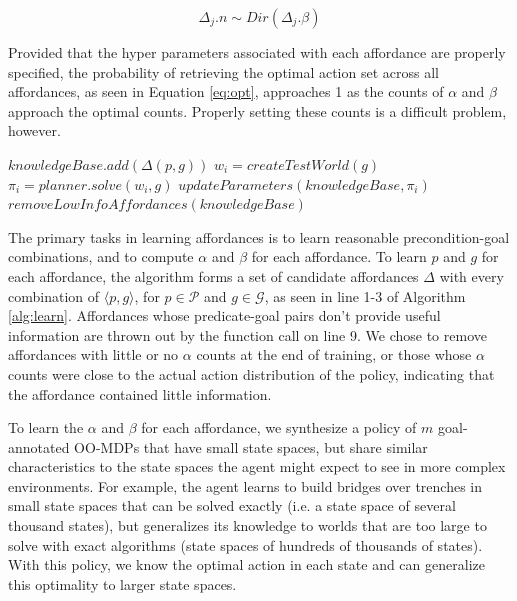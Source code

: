 \documentclass[conference]{IEEEtran}
\begin{document}
\begin{equation}
\Delta_j.n \sim Dir(\Delta_j.\beta)
\end{equation}

Provided that the hyper parameters associated with each
affordance are properly specified, the probability of retrieving the optimal
action set across all affordances, as seen in Equation \ref{eq:opt}, approaches
1 as the counts of $\alpha$ and $\beta$ approach the optimal counts. Properly setting these counts
is a difficult problem, however.

\begin{algorithm}
  \caption{$learn(\mathcal{P}, \mathcal{G})$}
  \begin{algorithmic}[1]
    \State $knowledgeBase.add(\Delta(p,g))$
    \EndFor
    \State $w_i = createTestWorld(g)$
    \State $\pi_i = planner.solve(w_i, g)$
    \State $updateParameters(knowledgeBase, \pi_i)$
    \EndFor
    \State $removeLowInfoAffordances(knowledgeBase)$
  \end{algorithmic}
  \label{alg:learn}
\end{algorithm}
The primary tasks in learning affordances is to learn reasonable precondition-goal combinations,
and to compute $\alpha$ and $\beta$ for each affordance. To learn $p$ and $g$ for each affordance, 
the algorithm forms a set of candidate affordances $\Delta$ with every
combination of $\langle p, g \rangle$, for $p \in \mathcal{P}$ and $g
\in \mathcal{G}$, as seen in line 1-3 of Algorithm \ref{alg:learn}. Affordances
whose predicate-goal pairs don't provide useful information are thrown out by the function call on line 9.
We chose to remove affordances with little or no $\alpha$ counts at the end of training, or those
whose $\alpha$ counts were close to the actual action distribution of the policy, indicating that the affordance
contained little information.

To learn the $\alpha$ and $\beta$ for each
affordance, we synthesize a policy of $m$ goal-annotated
OO-MDPs that have small state spaces, but share similar characteristics
to the state spaces the agent might expect to see in more
complex environments. For example, the agent learns to build bridges
over trenches in small state spaces that can be solved exactly (i.e. a state space of several thousand states), but
generalizes its knowledge to worlds that are too large to
solve with exact algorithms (state spaces of hundreds of thousands of states). With this policy,
we know the optimal action in each state and can generalize this optimality to larger state spaces.
\end{document}
